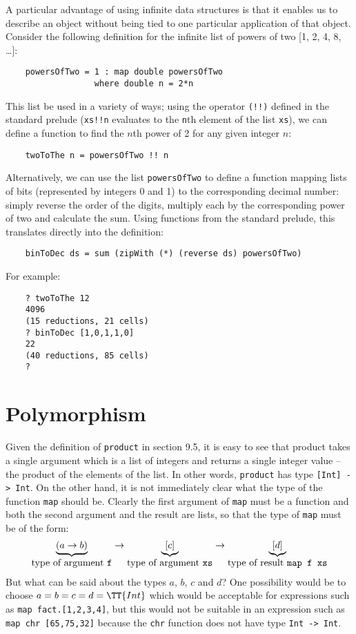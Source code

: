 A particular advantage of using infinite data  structures  is  that  it
enables us to describe an object without being tied to  one  particular
application of that object.  Consider the following definition for  the
infinite list of powers of two [1, 2, 4, 8, \dots]:
\begin{verbatim}
    powersOfTwo = 1 : map double powersOfTwo 
                  where double n = 2*n
\end{verbatim}
This list be used in a variety of ways; using the operator \verb"(!!)" defined
in the standard prelude (\verb"xs!!n" evaluates to the \verb"n"th
element of the list
\verb"xs"), we can define a function to find the $n$th power of 2 for  
any given
integer $n$:
\begin{verbatim}
    twoToThe n = powersOfTwo !! n 
\end{verbatim}
Alternatively, we can use the list \verb"powersOfTwo" to define  a  function
mapping lists of  bits  (represented  by  integers  0  and  1)  to  the
corresponding decimal number: simply reverse the order of  the  digits,
multiply each by the corresponding power of two and calculate the  sum.
Using functions from the standard  prelude,  this  translates  directly
into the definition:
\begin{verbatim}
    binToDec ds = sum (zipWith (*) (reverse ds) powersOfTwo)
\end{verbatim}
For example:
\begin{verbatim}
    ? twoToThe 12
    4096
    (15 reductions, 21 cells)
    ? binToDec [1,0,1,1,0]
    22
    (40 reductions, 85 cells)
    ?
\end{verbatim}

\section{Polymorphism}
Given the definition of \verb"product" in section 9.5, it  is  easy  to  see
that product takes a single argument which is a list  of  integers  and
returns a single integer value -- the product of the  elements  of  the
list.  In other words, \verb"product" has type \verb"[Int] -> Int".
On  the  other
hand, it is not immediately clear what the type of the  function  \verb"map"
should be.  Clearly the first argument of \verb"map" must be a function  and
both the second argument and the result are lists, so that the type  of
\verb"map" must be of the form:
\[
               \underbrace{(a\to b)}_{\mbox{type of argument {\tt f}}}
            \to\underbrace{[c]}_{\mbox{type of argument {\tt xs}}}
            \to\underbrace{[d]}_{\mbox{type of result {\tt map f xs}}}
\]
But what can be said about the types $a$, $b$, $c$ and  $d$?   One  possibility
would be to choose $a = b = c = d = \TT{Int}$ which would  be  acceptable  for
expressions such as  \verb"map fact.[1,2,3,4]",  but  this  would  not  be
suitable in an expression such as  \verb"map chr [65,75,32]"  because  the
\verb"chr" function does not have type \verb"Int -> Int".

